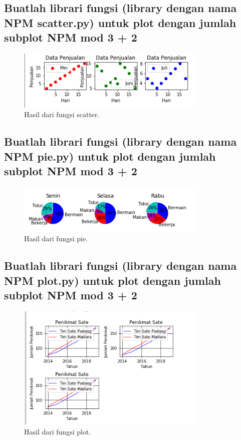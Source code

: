 \subsection{Buatlah librari fungsi (library dengan nama NPM scatter.py) untuk plot dengan jumlah subplot NPM mod 3 + 2}

\begin{figure}[H]
	\includegraphics[width=9cm]{figures/6/Praktek/1174096/scatter.png}
	\caption{Hasil dari fungsi scatter.}
	\centering
\end{figure}

\subsection{Buatlah librari fungsi (library dengan nama NPM pie.py) untuk plot dengan jumlah subplot NPM mod 3 + 2}

\begin{figure}[H]
	\includegraphics[width=9cm]{figures/6/Praktek/1174096/pie.png}
	\caption{Hasil dari fungsi pie.}
	\centering
\end{figure}

\subsection{Buatlah librari fungsi (library dengan nama NPM plot.py) untuk plot dengan jumlah subplot NPM mod 3 + 2}

\begin{figure}[H]
	\includegraphics[width=9cm]{figures/6/Praktek/1174096/plot.png}
	\caption{Hasil dari fungsi plot.}
	\centering
\end{figure}

